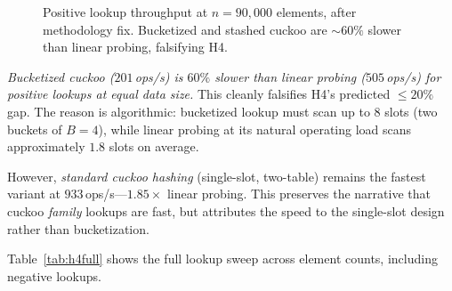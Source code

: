 \documentclass[10pt,journal,compsoc]{IEEEtran}
\begin{document}
\begin{figure}[t]
\centering
{}
\caption{Positive lookup throughput at $n=90{,}000$ elements, after methodology fix. Bucketized and stashed cuckoo are $\sim 60\%$ slower than linear probing, falsifying H4.}
\label{fig:h4}
\end{figure}

\emph{Bucketized cuckoo ($201$\,ops/s) is $60\%$ slower than linear probing ($505$\,ops/s) for positive lookups at equal data size.} This cleanly falsifies H4's predicted $\le 20\%$ gap. The reason is algorithmic: bucketized lookup must scan up to $8$ slots (two buckets of $B=4$), while linear probing at its natural operating load scans approximately $1.8$ slots on average.

However, \emph{standard cuckoo hashing} (single-slot, two-table) remains the fastest variant at $933$\,ops/s---$1.85\times$ linear probing. This preserves the narrative that cuckoo \emph{family} lookups are fast, but attributes the speed to the single-slot design rather than bucketization.

Table~\ref{tab:h4full} shows the full lookup sweep across element counts, including negative lookups.
\end{document}
